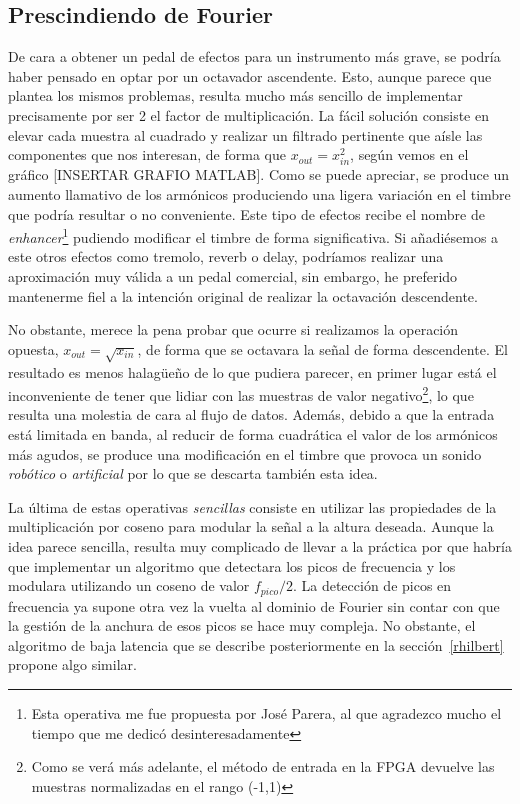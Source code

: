 \subsection{Prescindiendo de Fourier}
\label{nofourier}
De cara a obtener un pedal de efectos para un instrumento más grave, se podría haber pensado en optar por un octavador ascendente. Esto, aunque parece que plantea los mismos problemas, resulta mucho más sencillo de implementar precisamente por ser 2 el factor de multiplicación. La fácil solución consiste en elevar cada muestra al cuadrado y realizar un filtrado pertinente que aísle las componentes que nos interesan, de forma que $x_{out} = x_{in}^{2}$, según vemos en el gráfico [INSERTAR GRAFIO MATLAB]. Como se puede apreciar, se produce un aumento llamativo de los armónicos produciendo una ligera variación en el timbre que podría resultar o no conveniente. Este tipo de efectos recibe el nombre de \emph{enhancer}\footnote{Esta operativa me fue propuesta por José Parera, al que agradezco mucho el tiempo que me dedicó desinteresadamente} pudiendo modificar el timbre de forma significativa. Si añadiésemos a este otros efectos como tremolo, reverb o delay, podríamos realizar una aproximación muy válida a un pedal comercial, sin embargo, he preferido mantenerme fiel a la intención original de realizar la octavación descendente.

No obstante, merece la pena probar que ocurre si realizamos la operación opuesta, $x_{out} = \sqrt{x_{in}}$, de forma que se octavara la señal de forma descendente. El resultado es menos halagüeño de lo que pudiera parecer, en primer lugar está el inconveniente de tener que lidiar con las muestras de valor negativo\footnote{Como se verá más adelante, el método de entrada en la FPGA devuelve las muestras normalizadas en el rango (-1,1)}, lo que resulta una molestia de cara al flujo de datos. Además, debido a que la entrada está limitada en banda, al reducir de forma cuadrática el valor de los armónicos más agudos, se produce una modificación en el timbre que provoca un sonido \emph{robótico} o \emph{artificial} por lo que se descarta también esta idea.

La última de estas operativas \emph{sencillas} consiste en utilizar las propiedades de la multiplicación por coseno para modular la señal a la altura deseada. Aunque la idea parece sencilla, resulta muy complicado de llevar a la práctica por que habría que implementar un algoritmo que detectara los picos de frecuencia y los modulara utilizando un coseno de valor $f_{pico}/2$. La detección de picos en frecuencia ya supone otra vez la vuelta al dominio de Fourier sin contar con que la gestión de la anchura de esos picos se hace muy compleja. No obstante, el algoritmo de baja latencia que se describe posteriormente en la sección~\ref{rhilbert} propone algo similar.

